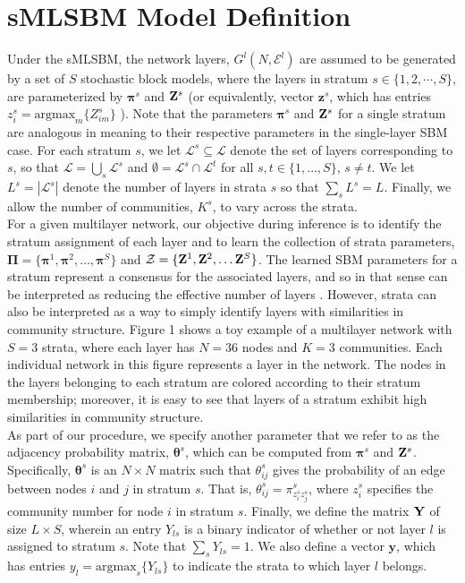 \section{sMLSBM Model Definition}
\indent Under the sMLSBM, the network layers, $G^{l}(N,\mathcal{E}^{l})$ are assumed to be generated by a set of $S$ stochastic block models, where the layers in stratum $s \in \{1,2,\cdots,S \}$, are parameterized by ${\boldsymbol \pi}^{s}$ and ${\bf Z}^{s}$ (or equivalently, vector ${\boldsymbol z}^s$, which has entries $z^s_{i}=\text{argmax}_m \{Z_{im}^s\}$ ). Note that the parameters ${\boldsymbol \pi}^{s}$ and ${\bf Z}^{s}$ for a single stratum are analogous in meaning to their respective parameters in the single-layer SBM case. 
For each stratum $s$, we let $\mathcal{L}^s\subseteq\mathcal{L}$ denote the set of layers corresponding to $s$, so that $\mathcal{L}=\bigcup_s \mathcal{L}^s$ and $\emptyset=\mathcal{L}^s\cap \mathcal{L}^t$ for all $s,t\in\{1,\dots,S\}$, $s\neq t$. We let $L^s=|\mathcal{L}^s|$ denote the number of layers in strata $s$ so that $\sum_s L^s=L$.
Finally, we allow the number of communities, $K^{s}$, to vary across the strata.
\\\indent
For a given multilayer network, our objective during inference is to identify the stratum assignment of each layer and to learn the collection of strata parameters, $\boldsymbol{\Pi}=\{\boldsymbol{\pi}^{1},\boldsymbol{\pi}^{2},\dots,\boldsymbol{\pi}^{S}\}$ and $\mathcal{Z}=\{{\bf{Z}}^{1},{\bf{Z}}^{2},\dots {\bf{Z}}^{S}\}$. The learned SBM parameters for a stratum represent a consensus for the associated layers, and so in that sense can be interpreted as reducing the effective number of layers \cite{domen}. However, strata can also be interpreted as a way to simply identify layers with similarities in community structure. Figure 1 shows a toy example of a multilayer network with $S=3$ strata, where each layer has $N=36$ nodes and $K=3$ communities. Each individual network in this figure represents a layer in the network. The nodes in the layers belonging to each stratum are colored according to their stratum membership; moreover, it is easy to see that layers of a stratum exhibit high similarities in community structure.  \\
  \indent As part of our procedure, we specify another parameter that we refer to as the adjacency probability matrix, ${\boldsymbol \theta}^{s}$, which can be computed from $\boldsymbol{\pi}^{s}$ and ${\bf{Z}}^{s}$. Specifically, ${\boldsymbol \theta}^{s}$ is an $N \times N$ matrix such that ${\theta}_{ij}^{s}$ gives the probability of an edge between nodes $i$ and $j$ in stratum $s$. That is, ${\theta}_{ij}^{s}={ \pi}^{s}_{z_{i}^{s}z_{j}^{s}}$, where  $z_{i}^{s}$ specifies the community number for node $i$ in stratum $s$. Finally, we define the matrix ${\bf Y}$ of size $L\times S$, wherein an entry $Y_{ls}$ is a binary indicator of whether or not layer $l$ is assigned to stratum $s$. Note that $\sum_{s}Y_{ls}=1$. We also define a vector $\boldsymbol y$, which has entries $y_{l}=\text{argmax}_s \{Y_{ls}\}$ to indicate the strata to which layer $l$ belongs.

